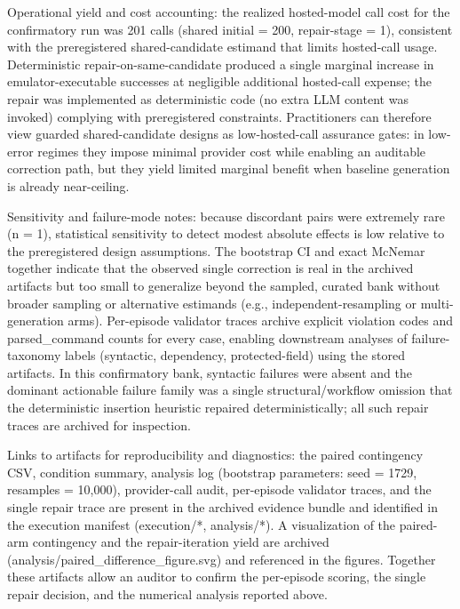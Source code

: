 \documentclass[conference]{IEEEtran}
\begin{document}
Operational yield and cost accounting: the realized hosted-model call cost for the confirmatory run was 201 calls (shared initial = 200, repair-stage = 1), consistent with the preregistered shared-candidate estimand that limits hosted-call usage. Deterministic repair-on-same-candidate produced a single marginal increase in emulator-executable successes at negligible additional hosted-call expense; the repair was implemented as deterministic code (no extra LLM content was invoked) complying with preregistered constraints. Practitioners can therefore view guarded shared-candidate designs as low-hosted-call assurance gates: in low-error regimes they impose minimal provider cost while enabling an auditable correction path, but they yield limited marginal benefit when baseline generation is already near-ceiling.

Sensitivity and failure-mode notes: because discordant pairs were extremely rare (n = 1), statistical sensitivity to detect modest absolute effects is low relative to the preregistered design assumptions. The bootstrap CI and exact McNemar together indicate that the observed single correction is real in the archived artifacts but too small to generalize beyond the sampled, curated bank without broader sampling or alternative estimands (e.g., independent-resampling or multi-generation arms). Per-episode validator traces archive explicit violation codes and parsed\_command counts for every case, enabling downstream analyses of failure-taxonomy labels (syntactic, dependency, protected-field) using the stored artifacts. In this confirmatory bank, syntactic failures were absent and the dominant actionable failure family was a single structural/workflow omission that the deterministic insertion heuristic repaired deterministically; all such repair traces are archived for inspection.

Links to artifacts for reproducibility and diagnostics: the paired contingency CSV, condition summary, analysis log (bootstrap parameters: seed = 1729, resamples = 10,000), provider-call audit, per-episode validator traces, and the single repair trace are present in the archived evidence bundle and identified in the execution manifest (execution/*, analysis/*). A visualization of the paired-arm contingency and the repair-iteration yield are archived (analysis/paired\_difference\_figure.svg) and referenced in the figures. Together these artifacts allow an auditor to confirm the per-episode scoring, the single repair decision, and the numerical analysis reported above.
\end{document}
